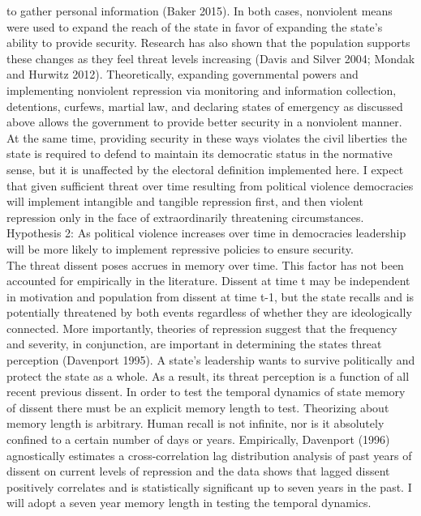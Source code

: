 \documentclass[ignorenonframetext,]{beamer}
\begin{document}
\begin{frame}[fragile]
to gather personal information (Baker 2015). In both cases, nonviolent
means were used to expand the reach of the state in favor of expanding
the state's ability to provide security. Research has also shown that
the population supports these changes as they feel threat levels
increasing (Davis and Silver 2004; Mondak and Hurwitz 2012).
Theoretically, expanding governmental powers and implementing nonviolent
repression via monitoring and information collection, detentions,
curfews, martial law, and declaring states of emergency as discussed
above allows the government to provide better security in a nonviolent
manner. At the same time, providing security in these ways violates the
civil liberties the state is required to defend to maintain its
democratic status in the normative sense, but it is unaffected by the
electoral definition implemented here. I expect that given sufficient
threat over time resulting from political violence democracies will
implement intangible and tangible repression first, and then violent
repression only in the face of extraordinarily threatening
circumstances.\\
Hypothesis 2: As political violence increases over time in democracies
leadership will be more likely to implement repressive policies to
ensure security.\\
The threat dissent poses accrues in memory over time. This factor has
not been accounted for empirically in the literature. Dissent at time t
may be independent in motivation and population from dissent at time
t-1, but the state recalls and is potentially threatened by both events
regardless of whether they are ideologically connected. More
importantly, theories of repression suggest that the frequency and
severity, in conjunction, are important in determining the states threat
perception (Davenport 1995). A state's leadership wants to survive
politically and protect the state as a whole. As a result, its threat
perception is a function of all recent previous dissent. In order to
test the temporal dynamics of state memory of dissent there must be an
explicit memory length to test. Theorizing about memory length is
arbitrary. Human recall is not infinite, nor is it absolutely confined
to a certain number of days or years. Empirically, Davenport (1996)
agnostically estimates a cross-correlation lag distribution analysis of
past years of dissent on current levels of repression and the data shows
that lagged dissent positively correlates and is statistically
significant up to seven years in the past. I will adopt a seven year
memory length in testing the temporal dynamics.\\

\end{frame}
\end{document}
